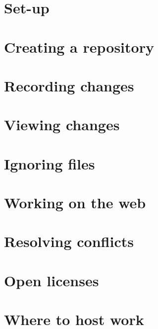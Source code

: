 \documentclass[presentation]{beamer}
\begin{document}
\section{Set-up}

\section{Creating a repository}

\section{Recording changes}

\section{Viewing changes}

\section{Ignoring files}

\section{Working on the web}

\section{Resolving conflicts}

\section{Open licenses}

\section{Where to host work}
\end{document}
